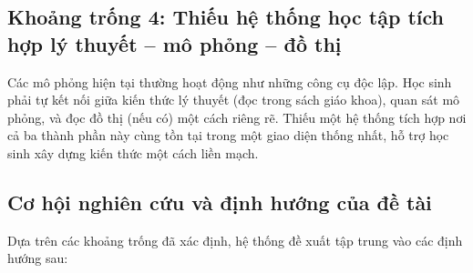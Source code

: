 \subsection{Khoảng trống 4: Thiếu hệ thống học tập tích hợp lý thuyết – mô phỏng – đồ thị}

Các mô phỏng hiện tại thường hoạt động như những công cụ độc lập. Học sinh phải tự kết nối giữa kiến thức lý thuyết (đọc trong sách giáo khoa), quan sát mô phỏng, và đọc đồ thị (nếu có) một cách riêng rẽ. Thiếu một hệ thống tích hợp nơi cả ba thành phần này cùng tồn tại trong một giao diện thống nhất, hỗ trợ học sinh xây dựng kiến thức một cách liền mạch.

\subsection{Cơ hội nghiên cứu và định hướng của đề tài}

Dựa trên các khoảng trống đã xác định, hệ thống đề xuất tập trung vào các định hướng sau:

